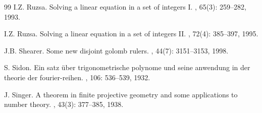 \documentclass[preprint,12pt]{elsarticle}
\begin{document}
\begin{thebibliography}{99}
I.Z. Ruzsa.
\newblock Solving a linear equation in a set of integers I.
, 65(3): 259--282, 1993.

I.Z. Ruzsa.
\newblock Solving a linear equation in a set of integers II.
, 72(4): 385--397, 1995.

J.B. Shearer.
\newblock Some new disjoint golomb rulers.
, 44(7): 3151--3153,
  1998.

S. Sidon.
\newblock Ein satz {\"u}ber trigonometrische polynome und seine anwendung in
  der theorie der fourier-reihen.
, 106: 536--539, 1932.

J. Singer.
\newblock A theorem in finite projective geometry and some applications to
  number theory.
,
  43(3): 377--385, 1938.




\end{thebibliography}
\end{document}
